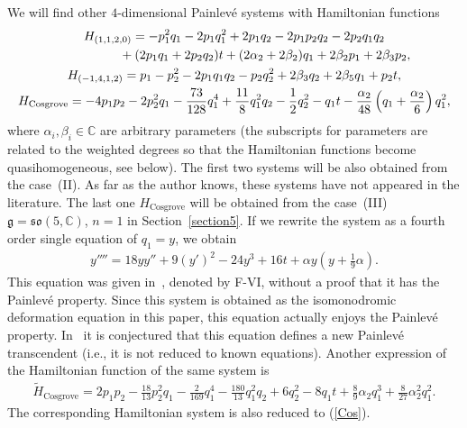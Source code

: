 \documentclass[pdftex]{sigma}
\numberwithin{equation}{section}
\begin{document}
We will f\/ind other $4$-dimensional Painlev\'{e} systems with Hamiltonian functions
\begin{gather}
H_{(1,1,2,0)} = -p_1^2q_1 - 2p_1q_1^2 + 2p_1q_2 - 2p_1p_2q_2 - 2p_2q_1q_2 \nonumber \\
\hphantom{H_{(1,1,2,0)} =}{} + (2p_1q_1 + 2p_2q_2)t + (2\alpha _2 + 2\beta_2 )q_1 + 2\beta_2 p_1 + 2\beta_3 p_2, \label{1120} \\
H_{(-1,4,1,2)} = p_1 - p_2^2 - 2p_1q_1q_2 - p_2q_2^2 + 2 \beta_3 q_2 + 2\beta_5 q_1 + p_2t, \label{-1412} \\
H_{\text{Cosgrove}} = -4p_1p_2 - 2p_2^2q_1 - \frac{73}{128}q_1^4 + \frac{11}{8}q_1^2q_2- \frac{1}{2}q_2^2 - q_1t - \frac{\alpha_2}{48}\left( q_1 + \frac{\alpha_2}{6} \right) q_1^2,\label{4dimCos}
\end{gather}
where $\alpha_i, \beta_i \in \mathbb{C}$ are arbitrary parameters (the subscripts for parameters are related to the weighted degrees so that the Hamiltonian functions become quasihomogeneous, see below). The f\/irst two systems will be also obtained from the case~(II). As far as the author knows, these systems have not appeared in the literature. The last one $H_{\text{Cosgrove}}$ will be obtained from the case~(III) $\mathfrak{g} = \mathfrak{so}(5, \mathbb{C})$, $n =1$ in Section~\ref{section5}. If we rewrite the system as a fourth order single equation of $q_1 = y$, we obtain
\begin{gather}
y'''' = 18 yy'' + 9(y')^2 - 24y^3 + 16t + \alpha y \left(y + \frac{1}{9}\alpha \right).\label{Cos}
\end{gather}
This equation was given in~\cite{Cos}, denoted by F-VI, without a proof that it has the Painlev\'{e} property. Since this system is obtained as the isomonodromic deformation equation in this paper, this equation actually enjoys the Painlev\'{e} property. In~\cite{Cos} it is conjectured that this equation def\/ines a new Painlev\'{e} transcendent (i.e., it is not reduced to known equations). Another expression of the Hamiltonian function of the same system is
\begin{gather}
\widetilde{H}_{\text{Cosgrove}} = 2p_1p_2 - \frac{18}{13}p_2^2q_1 - \frac{2}{169}q_1^4
 - \frac{180}{13}q_1^2q_2 + 6q_2^2 - 8q_1t + \frac{8}{9}\alpha _2q_1^3 + \frac{8}{27}\alpha _2^2q_1^2.\label{4dimCos2}
\end{gather}
The corresponding Hamiltonian system is also reduced to (\ref{Cos}).
\end{document}
